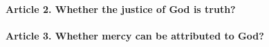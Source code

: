 \documentclass{ucetd}
\begin{document}
\paragraph{Article 2. Whether the justice of God is truth?}
\paragraph{Article 3. Whether mercy can be attributed to God?}
\end{document}
